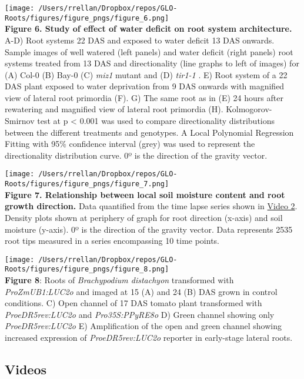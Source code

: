 \documentclass[]{article}
\begin{document}
\texttt{[image: /Users/rrellan/Dropbox/repos/GLO-Roots/figures/figure\_pngs/figure\_6.png]}\\\textbf{Figure
6. Study of effect of water deficit on root system architecture.} A-D)
Root systems 22 DAS and exposed to water deficit 13 DAS onwards. Sample
images of well watered (left panels) and water deficit (right panels)
root systems treated from 13 DAS and directionality (line graphs to left
of images) for (A) Col-0 (B) Bay-0 (C) \emph{miz1} mutant and (D)
\emph{tir1-1} . E) Root system of a 22 DAS plant exposed to water
deprivation from 9 DAS onwards with magnified view of lateral root
primordia (F). G) The same root as in (E) 24 hours after rewatering and
magnified view of lateral root primordia (H). Kolmogorov-Smirnov test at
p \textless{} 0.001 was used to compare directionality distributions
between the different treatments and genotypes. A Local Polynomial
Regression Fitting with 95\% confidence interval (grey) was used to
represent the directionality distribution curve. 0º is the direction of
the gravity vector.



\texttt{[image: /Users/rrellan/Dropbox/repos/GLO-Roots/figures/figure\_pngs/figure\_7.png]}\\\textbf{Figure
7. Relationship between local soil moisture content and root growth
direction.} Data quantified from the time lapse series shown in
\href{https://www.dropbox.com/s/x24x1uhvc8x0ou9/Video_3.avi?dl=0}{Video
2}. Density plots shown at periphery of graph for root direction
(x-axis) and soil moisture (y-axis). 0º is the direction of the gravity
vector. Data represents 2535 root tips measured in a series encompassing
10 time points.



\texttt{[image: /Users/rrellan/Dropbox/repos/GLO-Roots/figures/figure\_pngs/figure\_8.png]}\\\textbf{Figure
8}: Roots of \emph{Brachypodium distachyon} transformed with
\emph{ProZmUB1:LUC2o} and imaged at 15 (A) and 24 (B) DAS grown in
control conditions. C) Open channel of 17 DAS tomato plant transformed
with \emph{ProeDR5rev:LUC2o} and \emph{Pro35S:PPyRE8o} D) Green channel
showing only \emph{ProeDR5rev:LUC2o} E) Amplification of the open and
green channel showing increased expression of \emph{ProeDR5rev:LUC2o}
reporter in early-stage lateral roots.


\subsection{Videos}\label{videos}
\end{document}
